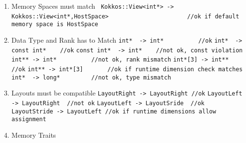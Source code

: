 \begin{enumerate}
\item Memory Spaces must match
  \subitem \lstinline{ Kokkos::View<int*> -> Kokkos::View<int*,HostSpace>}
  \subitem \lstinline{                      //ok if default memory space is HostSpace}
\item Data Type and Rank has to Match
\subitem \lstinline{int*  -> int*          //ok}
\subitem \lstinline{int*  -> const int*    //ok}
\subitem \lstinline{const int*  -> int*    //not ok, const violation}
\subitem \lstinline{int** -> int*          //not ok, rank mismatch}
\subitem \lstinline{int*[3] -> int**       //ok}
\subitem \lstinline{int** -> int*[3]       //ok if runtime dimension check matches}
\subitem \lstinline{int*  -> long*         //not ok, type mismatch}
\item Layouts must be compatible
\subitem \lstinline{LayoutRight -> LayoutRight //ok}
\subitem \lstinline{LayoutLeft -> LayoutRight  //not ok}
\subitem \lstinline{LayoutLeft -> LayoutSride  //ok}
\subitem \lstinline{LayoutStride -> LayoutLeft //ok if runtime dimensions allow assignment}
\item Memory Traits 
\end{enumerate}


